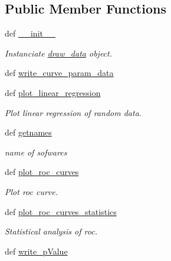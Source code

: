\subsection*{\-Public \-Member \-Functions}
\begin{DoxyCompactItemize}
\item 
def \hyperlink{classirna_1_1iRNA__stat_1_1Draw__data_1_1draw__data_a3de404667133556434a29aed1d458e2c}{\-\_\-\-\_\-init\-\_\-\-\_\-}
\begin{DoxyCompactList}\small\item\em \-Instanciate \hyperlink{classirna_1_1iRNA__stat_1_1Draw__data_1_1draw__data}{draw\-\_\-data} object. \end{DoxyCompactList}\item 
def \hyperlink{classirna_1_1iRNA__stat_1_1Draw__data_1_1draw__data_a2581b3585d035fe70da1085d7b4ddd47}{write\-\_\-curve\-\_\-param\-\_\-data}
\item 
def \hyperlink{classirna_1_1iRNA__stat_1_1Draw__data_1_1draw__data_a311a8daec998912750a1aad6ca536229}{plot\-\_\-linear\-\_\-regression}
\begin{DoxyCompactList}\small\item\em \-Plot linear regression of random data. \end{DoxyCompactList}\item 
def \hyperlink{classirna_1_1iRNA__stat_1_1Draw__data_1_1draw__data_ade2b06608eee3e20acfb591a39121a38}{getnames}
\begin{DoxyCompactList}\small\item\em name of sofwares \end{DoxyCompactList}\item 
def \hyperlink{classirna_1_1iRNA__stat_1_1Draw__data_1_1draw__data_ab26e80e086476a8fad520a47ccbc341e}{plot\-\_\-roc\-\_\-curves}
\begin{DoxyCompactList}\small\item\em \-Plot roc curve. \end{DoxyCompactList}\item 
def \hyperlink{classirna_1_1iRNA__stat_1_1Draw__data_1_1draw__data_ae3abbcb0ed025b026ab0232b0eb3ae86}{plot\-\_\-roc\-\_\-curves\-\_\-statistics}
\begin{DoxyCompactList}\small\item\em \-Statistical analysis of roc. \end{DoxyCompactList}\item 
def \hyperlink{classirna_1_1iRNA__stat_1_1Draw__data_1_1draw__data_a032f6e03cd4bd6ad0187b38ac1f36074}{write\-\_\-p\-Value}

\end{DoxyCompactItemize}
